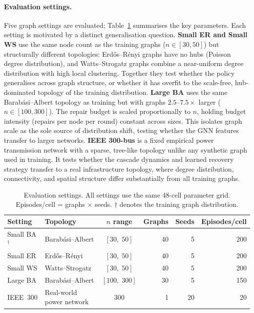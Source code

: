 \documentclass[11pt]{article}
\begin{document}
\paragraph{Evaluation settings.}
Five graph settings are evaluated; Table~\ref{tab:settings} summarises
the key parameters.
Each setting is motivated by a distinct generalisation question.
\textbf{Small ER and Small WS} use the same node count as the training
graphs ($n\in[30,50]$) but structurally different topologies:
Erd\H{o}s--R\'enyi graphs have no hubs (Poisson degree distribution),
and Watts--Strogatz graphs combine a near-uniform degree distribution
with high local clustering.
Together they test whether the policy generalises across graph structure,
or whether it has overfit to the scale-free, hub-dominated topology of
the training distribution.
\textbf{Large BA} uses the same Barab\'asi--Albert topology as training
but with graphs $2.5$--$7.5\times$ larger ($n\in[100,300]$).
The repair budget is scaled proportionally to $n$, holding budget
intensity (repairs per node per round) constant across sizes.
This isolates graph scale as the sole source of distribution shift,
testing whether the GNN features transfer to larger networks.
\textbf{IEEE 300-bus} is a fixed empirical power transmission network
with a sparse, tree-like topology unlike any synthetic graph used in
training.
It tests whether the cascade dynamics and learned recovery strategy
transfer to a real infrastructure topology, where degree distribution,
connectivity, and spatial structure differ substantially from all
training graphs.

\begin{table}[htbp]
\centering
\caption{Evaluation settings. All settings use the same 48-cell parameter
         grid. Episodes/cell = graphs $\times$ seeds. $\dagger$ denotes the
         training graph distribution.}
\label{tab:settings}
\setlength{\tabcolsep}{7pt}
\begin{tabular}{llcrrr}
\toprule
Setting      & Topology                     & $n$ range    & Graphs & Seeds & Episodes/cell \\
\midrule
Small BA$^\dagger$ & Barab\'asi--Albert      & $[30,\;50]$  &  40 &  5 & 200 \\
Small ER     & Erd\H{o}s--R\'enyi           & $[30,\;50]$  &  40 &  5 & 200 \\
Small WS     & Watts--Strogatz              & $[30,\;50]$  &  40 &  5 & 200 \\
Large BA     & Barab\'asi--Albert           & $[100,\;300]$&  30 &  5 & 150 \\
IEEE~300     & Real-world power network     & $300$        &   1 & 20 &  20 \\
\bottomrule
\end{tabular}
\end{table}
\end{document}
